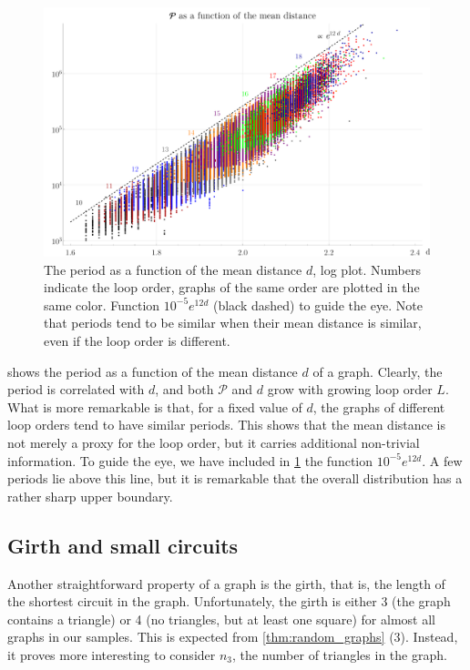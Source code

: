 \documentclass[12pt,a4paper]{article}
\newcommand{\period}{\mathcal P}
\renewcommand{\|}{\rule[-0.4ex]{0.2ex}{1.2em}}
\begin{document}
\begin{figure}[htb]
	\centering
	\includegraphics[width=.9\linewidth]{period_distance}
	\caption{The period as a function of the mean distance $d$, log plot. Numbers indicate the loop order, graphs of the same order are plotted in the same color. Function $10^{-5} e^{12  d}$ (black dashed) to guide the eye. Note that   periods  tend to be similar when their mean distance is similar, even if the loop order is different.  }
	\label{fig:period_distance}
\end{figure}

 shows the period as a function of the mean distance $d$ of a graph. Clearly, the period is correlated with $d$, and both $\period$ and $d$ grow with growing loop order $L$. What is more remarkable is that, for a fixed value of  $d$, the graphs of different loop orders tend to have similar periods. This shows that the mean distance is not merely a proxy for the loop order, but it carries additional non-trivial information.
To guide the eye, we have included in \cref{fig:period_distance} the function $10^{-5} e^{12d}$. A few periods lie above this line, but it is remarkable that the overall distribution has a rather sharp upper boundary. 


\subsection{Girth and small circuits}\label{sec:small_circuits}


Another straightforward property of a graph is the girth, that is, the length of the shortest circuit in the graph. Unfortunately, the girth is either 3 (the graph contains a triangle) or 4 (no triangles, but at least one square) for almost all graphs in our samples. This is expected from \cref{thm:random_graphs} (3). Instead, it proves more interesting to consider $n_3$, the number of triangles in the graph. 
\end{document}
